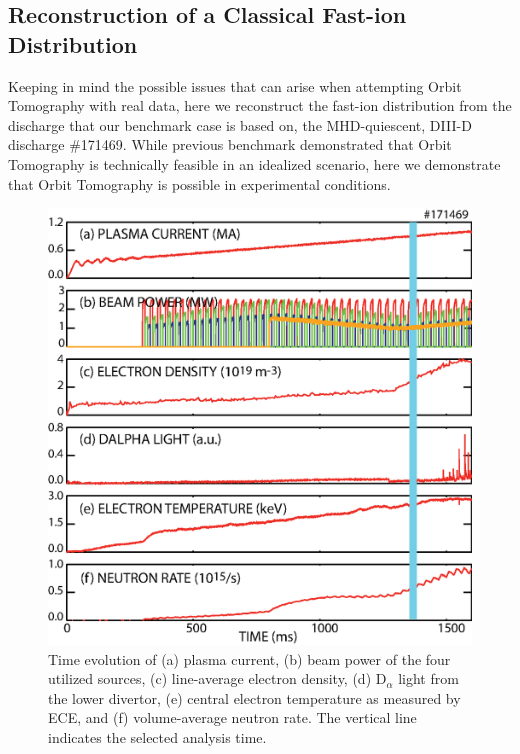 \subsection{Reconstruction of a Classical Fast-ion Distribution}
Keeping in mind the possible issues that can arise when attempting Orbit Tomography with real data, here we reconstruct the fast-ion distribution from the discharge that our benchmark case is based on, the MHD-quiescent, DIII-D discharge \#171469. While previous benchmark demonstrated that Orbit Tomography is technically feasible in an idealized scenario, here we demonstrate that Orbit Tomography is possible in experimental conditions.

\begin{figure}[h!]
    \centering
    \includegraphics[width=16cm]{figures/171469_plasma.eps}
    \caption{Time evolution of (a) plasma current, (b) beam power of the four utilized sources, (c) line-average electron density, (d) D$_\alpha$ light from the lower divertor, (e) central electron temperature as measured by ECE, and (f) volume-average neutron rate. The vertical line indicates the selected analysis time.}
    \label{fig:d3d_plasma}
\end{figure}
